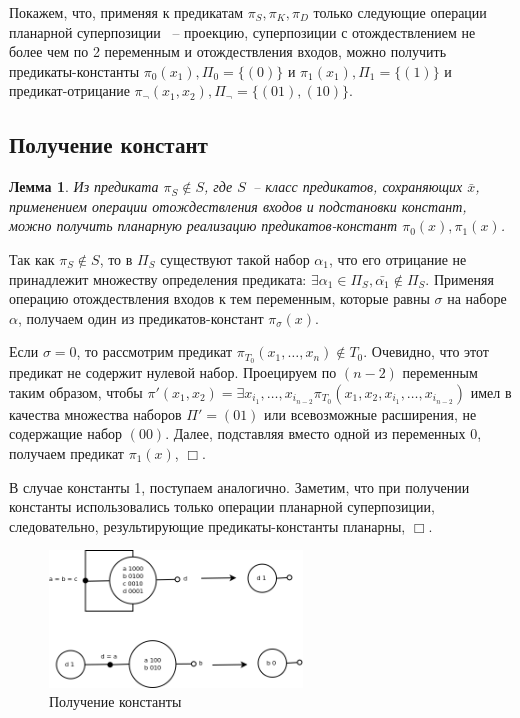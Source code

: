 \documentclass[12pt]{extarticle}
\newtheorem{lemma}[theorem]{Лемма}
\newenvironment{proof}[1][Доказательство.]{\begin{trivlist}
\item[\hskip \labelsep {\bfseries #1}]}{\end{trivlist}}
\begin{document}
Покажем, что, применяя к предикатам $\pi_S, \pi_K, \pi_D$ только следующие операции планарной суперпозиции ~-- проекцию,
суперпозиции с отождествлением не более чем по 2 переменным и отождествления входов, 
можно получить предикаты-константы
$\pi_0(x_1), \Pi_0=\{ (0) \}$ и $\pi_1(x_1), \Pi_1=\{ (1) \}$ и предикат-отрицание 
$\pi_{\neg}(x_1, x_2), \Pi_{\neg}=\{ (01), (10) \}$.

\subsection{Получение констант}
\begin{lemma}
\label{eq:const}
Из предиката $\pi_S \notin S$, где $S$~-- класс предикатов, сохраняющих $\bar{x}$, 
применением операции отождествления входов и подстановки констант,
можно получить планарную реализацию предикатов-констант $\pi_0(x), \pi_1(x)$.
\end{lemma}

\begin{proof}
Так как $\pi_S \notin S$, то в $\Pi_S$ существуют такой набор
$\alpha_1$, что его отрицание не принадлежит множеству определения предиката:
$\exists \alpha_1 \in \Pi_S, \bar{\alpha_1} \notin \Pi_S$.
Применяя операцию отождествления входов к тем переменным, которые равны $\sigma$ на наборе $\alpha$,
получаем один из предикатов-констант $\pi_{\sigma}(x)$.

Если $\sigma = 0$, то рассмотрим предикат 
$\pi_{T_0}(x_1, \dots, x_n) \notin T_0$. Очевидно, что этот предикат не содержит нулевой набор. 
Проецируем по $(n-2)$ переменным таким образом, чтобы 
$\pi'(x_1, x_2) = \exists {x_{i_1}, \dots, x_{i_{n-2}}} \pi_{T_0}(x_1, x_2, x_{i_1}, \dots, x_{i_{n-2}})$
имел в качества множества наборов $\Pi' = { (01) }$ или всевозможные расширения, не содержащие набор $(00)$.
Далее, подставляя вместо одной из переменных 0, получаем предикат $\pi_1(x)$, $\Box$. 

В случае константы 1, поступаем аналогично. 
Заметим, что при получении константы использовались только операции планарной суперпозиции, следовательно, 
результирующие предикаты-константы планарны, $\Box$.
\end{proof}
\begin{figure}[htb]
\centering
\includegraphics[width=0.6\textwidth]{const.png}
\caption{Получение константы}
\label{fig:constant}
\end{figure}
\end{document}
